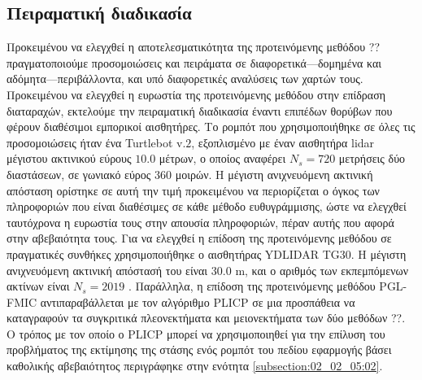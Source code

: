 \subsection{Πειραματική διαδικασία}
\label{subsection:02_03_04:01}

Προκειμένου να ελεγχθεί η αποτελεσματικότητα της προτεινόμενης μεθόδου ??
πραγματοποιούμε προσομοιώσεις και πειράματα σε διαφορετικά---δομημένα και
αδόμητα---περιβάλλοντα, και υπό διαφορετικές αναλύσεις των χαρτών τους.
Προκειμένου να ελεγχθεί η ευρωστία της προτεινόμενης μεθόδου στην επίδραση
διαταραχών, εκτελούμε την πειραματική διαδικασία έναντι επιπέδων θορύβων που
φέρουν διαθέσιμοι εμπορικοί αισθητήρες. Το ρομπότ που χρησιμοποιήθηκε σε όλες
τις προσομοιώσεις ήταν ένα Turtlebot v.$2$, εξοπλισμένο με έναν αισθητήρα lidar
μέγιστου ακτινικού εύρους $10.0$ μέτρων, ο οποίος αναφέρει $N_s=720$ μετρήσεις
δύο διαστάσεων, σε γωνιακό εύρος $360$ μοιρών. Η μέγιστη ανιχνευόμενη ακτινική
απόσταση ορίστηκε σε αυτή την τιμή προκειμένου να περιορίζεται ο όγκος των
πληροφοριών που είναι διαθέσιμες σε κάθε μέθοδο ευθυγράμμισης, ώστε να ελεγχθεί
ταυτόχρονα η ευρωστία τους στην απουσία πληροφοριών, πέραν αυτής που
αφορά στην αβεβαιότητα τους. Για να ελεγχθεί η επίδοση της προτεινόμενης
μεθόδου σε πραγματικές συνθήκες χρησιμοποιήθηκε ο αισθητήρας YDLIDAR TG30. Η
μέγιστη ανιχνευόμενη ακτινική απόστασή του είναι $30.0$ m, και ο αριθμός των
εκπεμπόμενων ακτίνων είναι $N_s = 2019$ \cite{ydlidar}. Παράλληλα, η επίδοση
της προτεινόμενης μεθόδου PGL-FMIC αντιπαραβάλλεται με τον αλγόριθμο PLICP σε
μια προσπάθεια να καταγραφούν τα συγκριτικά πλεονεκτήματα και μειονεκτήματα των
δύο μεθόδων ??. Ο τρόπος με τον οποίο ο PLICP μπορεί να χρησιμοποιηθεί για την
επίλυση του προβλήματος της εκτίμησης της στάσης ενός ρομπότ του πεδίου
εφαρμογής βάσει καθολικής αβεβαιότητος περιγράφηκε στην ενότητα
\ref{subsection:02_02_05:02}.

